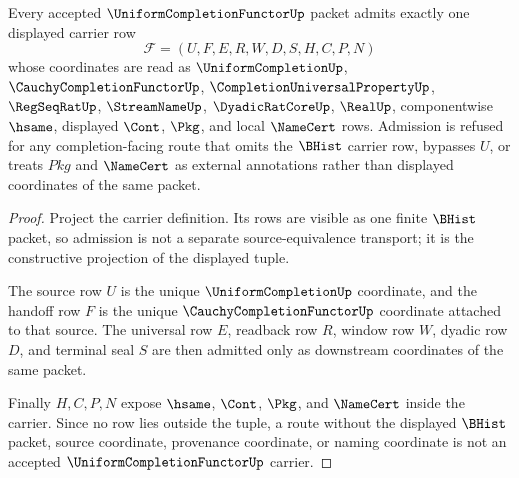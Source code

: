 \begin{theorem}
\label{thm:uniform-completion-functor-carrier-admission}
Every accepted $\UniformCompletionFunctorUp$ packet admits exactly one displayed carrier row
$$
\mathcal{F}=(U,F,E,R,W,D,S,H,C,P,N)
$$
whose coordinates are read as $\UniformCompletionUp$, $\CauchyCompletionFunctorUp$, $\CompletionUniversalPropertyUp$, $\RegSeqRatUp$, $\StreamNameUp$, $\DyadicRatCoreUp$, $\RealUp$, componentwise $\hsame$, displayed $\Cont$, $\Pkg$, and local $\NameCert$ rows. Admission is refused for any completion-facing route that omits the $\BHist$ carrier row, bypasses $U$, or treats $Pkg$ and $\NameCert$ as external annotations rather than displayed coordinates of the same packet.
\end{theorem}
\begin{proof}
Project the carrier definition. Its rows are visible as one finite $\BHist$ packet, so admission is not a separate source-equivalence transport; it is the constructive projection of the displayed tuple.

The source row $U$ is the unique $\UniformCompletionUp$ coordinate, and the handoff row $F$ is the unique $\CauchyCompletionFunctorUp$ coordinate attached to that source. The universal row $E$, readback row $R$, window row $W$, dyadic row $D$, and terminal seal $S$ are then admitted only as downstream coordinates of the same packet.

Finally $H,C,P,N$ expose $\hsame$, $\Cont$, $\Pkg$, and $\NameCert$ inside the carrier. Since no row lies outside the tuple, a route without the displayed $\BHist$ packet, source coordinate, provenance coordinate, or naming coordinate is not an accepted $\UniformCompletionFunctorUp$ carrier.
\end{proof}

